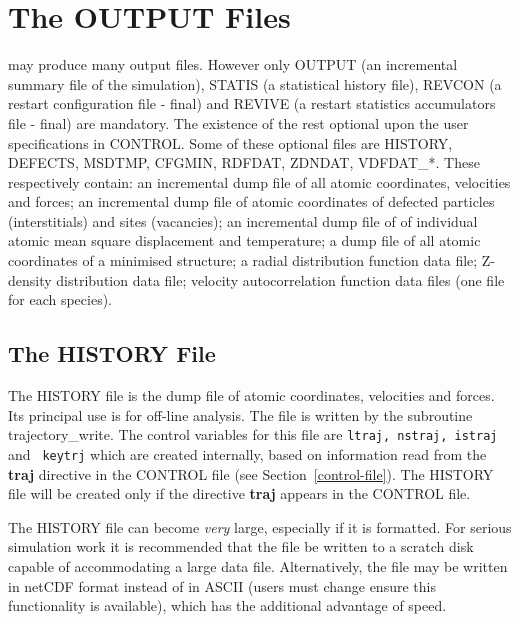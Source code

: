 \section{The OUTPUT Files}
\label{output-files}

\D may produce many output files.  However only OUTPUT
(an incremental summary file of the simulation), STATIS
(a statistical history file), REVCON (a restart configuration
file - final) and REVIVE (a restart statistics accumulators
file - final) are mandatory.  The existence of the rest
optional upon the user specifications in CONTROL.  Some of
these optional files are HISTORY, DEFECTS, MSDTMP, CFGMIN,
RDFDAT, ZDNDAT, VDFDAT\_*.  These respectively contain: an
incremental dump file of all atomic coordinates, velocities
and forces; an incremental dump file of atomic coordinates
of defected particles (interstitials) and sites (vacancies);
an incremental dump file of of individual atomic mean square
displacement and temperature; a dump file of all atomic
coordinates of a minimised structure; a radial distribution
function data file; Z-density distribution data file;
velocity autocorrelation function data files (one file
for each species).

\subsection{The HISTORY File}
\label{history-file}

The HISTORY file is the dump file of atomic coordinates, velocities
and forces.  Its principal use is for off-line analysis.  The file
is written by the subroutine {\sc trajectory\_write}.  The control
variables for this file are {\tt ltraj, nstraj, istraj} and {\tt
keytrj} which are created internally, based on information read from
the {\bf traj} directive in the CONTROL file (see Section~\ref{control-file}).
The HISTORY file will be created only if the directive {\bf traj}
appears in the CONTROL file.

The HISTORY file can become {\em very} large, especially if it is
formatted.  For serious simulation work it is recommended that the
file be written to a scratch disk capable of accommodating a large
data file.  Alternatively, the file may be written in netCDF format
instead of in ASCII (users must change ensure this functionality is
available), which has the additional advantage of speed.

